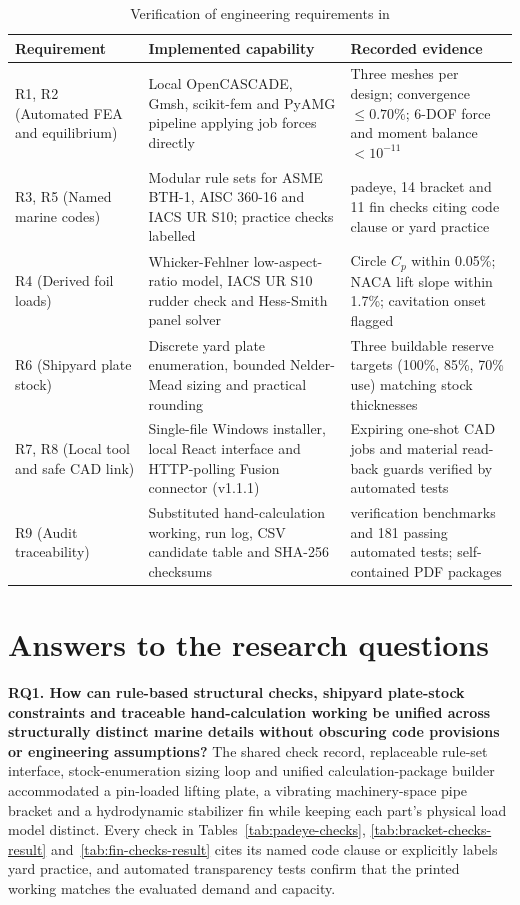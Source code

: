 \begin{table}[H]
\centering
\caption{Verification of engineering requirements in \NEMO{}}
\label{tab:requirements-summary}
\small
\begin{tabularx}{\textwidth}{>{\raggedright\arraybackslash}p{}>{\raggedright\arraybackslash}X>{\raggedright\arraybackslash}X}
\toprule
\textbf{Requirement} & \textbf{Implemented capability} & \textbf{Recorded evidence}\\
\midrule
R1, R2 (Automated FEA and equilibrium) & Local OpenCASCADE, Gmsh, scikit-fem and PyAMG pipeline applying job forces directly & Three meshes per design; convergence $\leq 0.70\%$; 6-DOF force and moment balance $< 10^{-11}$\\
R3, R5 (Named marine codes) & Modular rule sets for ASME BTH-1, AISC 360-16 and IACS UR S10; practice checks labelled & 15 padeye, 14 bracket and 11 fin checks citing code clause or yard practice\\
R4 (Derived foil loads) & Whicker-Fehlner low-aspect-ratio model, IACS UR S10 rudder check and Hess-Smith panel solver & Circle $C_p$ within 0.05\%; NACA lift slope within 1.7\%; cavitation onset flagged\\
R6 (Shipyard plate stock) & Discrete yard plate enumeration, bounded Nelder-Mead sizing and practical rounding & Three buildable reserve targets (100\%, 85\%, 70\% use) matching stock thicknesses\\
R7, R8 (Local tool and safe CAD link) & Single-file Windows installer, local React interface and HTTP-polling Fusion connector (v1.1.1) & Expiring one-shot CAD jobs and material read-back guards verified by automated tests\\
R9 (Audit traceability) & Substituted hand-calculation working, run log, CSV candidate table and SHA-256 checksums & 6 verification benchmarks and 181 passing automated tests; self-contained PDF packages\\
\bottomrule
\end{tabularx}
\end{table}

\section{Answers to the research questions}
\label{sec:research-answers}

\textbf{RQ1. How can rule-based structural checks, shipyard plate-stock
constraints and traceable hand-calculation working be unified across
structurally distinct marine details without obscuring code provisions or
engineering assumptions?} The shared check record, replaceable rule-set
interface, stock-enumeration sizing loop and unified calculation-package
builder accommodated a pin-loaded lifting plate, a vibrating machinery-space
pipe bracket and a hydrodynamic stabilizer fin while keeping each part's
physical load model distinct. Every check in Tables~\ref{tab:padeye-checks},
\ref{tab:bracket-checks-result} and~\ref{tab:fin-checks-result} cites its
named code clause or explicitly labels yard practice, and automated
transparency tests confirm that the printed working matches the evaluated
demand and capacity.

